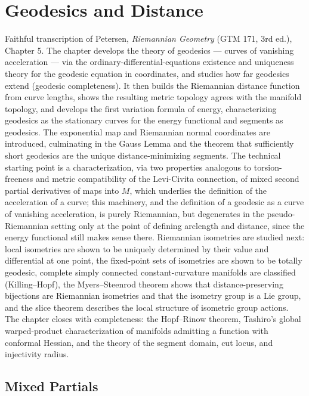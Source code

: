 \chapter{Geodesics and Distance}
\label{chap:pet-geodesics-and-distance}

Faithful transcription of Petersen, \emph{Riemannian Geometry} (GTM 171, 3rd ed.),
Chapter 5. The chapter develops the theory of geodesics — curves of vanishing
acceleration — via the ordinary-differential-equations existence and uniqueness
theory for the geodesic equation in coordinates, and studies how far geodesics
extend (geodesic completeness). It then builds the Riemannian distance function
from curve lengths, shows the resulting metric topology agrees with the manifold
topology, and develops the first variation formula of energy, characterizing
geodesics as the stationary curves for the energy functional and segments as
geodesics. The exponential map and Riemannian normal coordinates are introduced,
culminating in the Gauss Lemma and the theorem that sufficiently short geodesics
are the unique distance-minimizing segments. The technical starting point is a
characterization, via two properties analogous to torsion-freeness and metric
compatibility of the Levi-Civita connection, of mixed second partial derivatives
of maps into $M$, which underlies the definition of the acceleration of a curve;
this machinery, and the definition of a geodesic as a curve of vanishing
acceleration, is purely Riemannian, but degenerates in the pseudo-Riemannian
setting only at the point of defining arclength and distance, since the energy
functional still makes sense there. Riemannian isometries are studied
next: local isometries are shown to be uniquely determined by their value and
differential at one point, the fixed-point sets of isometries are shown to be
totally geodesic, complete simply connected constant-curvature manifolds are
classified (Killing–Hopf), the Myers–Steenrod theorem shows that distance-preserving
bijections are Riemannian isometries and that the isometry group is a Lie group,
and the slice theorem describes the local structure of isometric group actions.
The chapter closes with completeness: the Hopf–Rinow theorem, Tashiro's global
warped-product characterization of manifolds admitting a function with conformal
Hessian, and the theory of the segment domain, cut locus, and injectivity radius.

\section{Mixed Partials}


